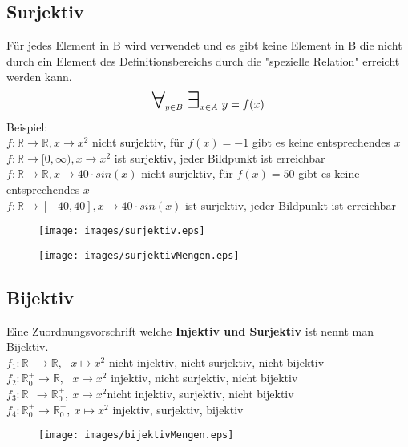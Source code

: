 \documentclass[a4paper]{scrartcl}
\newcommand\bigforall{\mbox{\huge $\forall$}}
\newcommand\bigexists{\mbox{\huge $\exists$}}
\begin{document}
\subsection{Surjektiv}
Für jedes Element in B wird verwendet und es gibt keine Element in B die nicht durch ein Element des Definitionsbereichs durch die "spezielle Relation" erreicht werden kann.
\begin{align}
\bigforall_{y \in B} \ \bigexists_{x \in A} \ y=f(x)
\end{align}
Beispiel: \\
$f: \mathbb{R} \rightarrow \mathbb{R}, x \rightarrow x^2$ nicht surjektiv, für $f(x)=-1$ gibt es keine entsprechendes $x$\\
$f: \mathbb{R} \rightarrow [0,\infty), x \rightarrow x^2$ ist surjektiv, jeder Bildpunkt ist erreichbar \\
$f: \mathbb{R} \rightarrow \mathbb{R}, x \rightarrow 40 \cdot sin(x)$ nicht surjektiv, für $f(x)=50$ gibt es keine entsprechendes $x$\\
$f: \mathbb{R} \rightarrow [-40,40], x \rightarrow 40 \cdot sin(x)$ ist surjektiv, jeder Bildpunkt ist erreichbar

\begin{figure}[h!]
\begin{center}
\texttt{[image: images/surjektiv.eps]}
\caption{}
\label{labelname}
\end{center}
\end{figure}
\begin{figure}[h!]
\begin{center}
\texttt{[image: images/surjektivMengen.eps]}
\caption{}
\label{labelname}
\end{center}
\end{figure}
\newpage

\subsection{Bijektiv}
Eine Zuordnungsvorschrift welche \textbf{Injektiv und Surjektiv} ist nennt man Bijektiv. \\
$f_1: \mathbb{R}\ \ \rightarrow\mathbb{R},\ \ \ x \mapsto x^2$ nicht injektiv, nicht surjektiv, nicht bijektiv \\
$f_2: \mathbb{R}^+_0\rightarrow\mathbb{R},\ \ \ x \mapsto x^2$ injektiv, nicht surjektiv, nicht bijektiv \\
$f_3: \mathbb{R}\ \ \rightarrow \mathbb{R}^+_0,\ x \mapsto x^2 $nicht injektiv, surjektiv, nicht bijektiv \\
$f_4: \mathbb{R}^+_0\rightarrow \mathbb{R}^+_0,\ x \mapsto x^2$ injektiv, surjektiv, bijektiv \\
\begin{figure}[h!]
\begin{center}
\texttt{[image: images/bijektivMengen.eps]}
\caption{}
\label{labelname}
\end{center}
\end{figure}
\newpage
\end{document}

